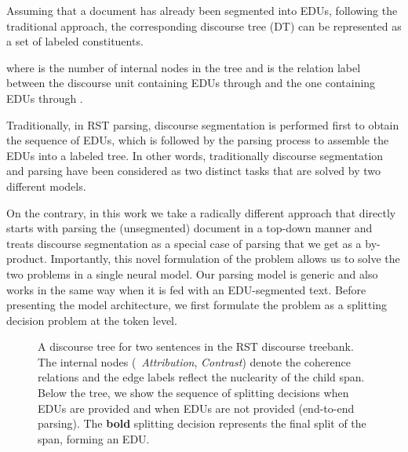 
Assuming that a document has already been segmented into EDUs, following the traditional approach, the corresponding discourse tree (DT) can be represented as a set of {labeled constituents}.

where  is the number of internal nodes in the tree and  is the relation label between the discourse unit containing EDUs  through  and the one containing EDUs  through . 

Traditionally, in RST parsing, {discourse segmentation} is performed first to obtain the sequence of EDUs, which is followed by the {parsing} process to assemble the EDUs into a labeled tree. In other words, traditionally discourse segmentation and parsing have been considered as two distinct tasks that are solved by two different models. 

On the contrary, in this work we take a radically different approach that directly starts with parsing the (unsegmented) document in a top-down manner and treats discourse segmentation as a special case of parsing that we get as a by-product. Importantly, this novel formulation of the problem allows us to solve the two problems in a single neural model. Our parsing model is generic and also works in the same way when it is fed with an EDU-segmented text. Before presenting the model architecture, we first formulate the problem as a splitting decision problem at the token level.  

\begin{figure*}[t!]
\caption{A discourse tree for two sentences in the RST discourse treebank. The internal nodes (\eg\ \emph{Attribution}, \emph{Contrast}) denote the coherence relations and the edge labels reflect the nuclearity of the child span. Below the tree, we show the sequence of splitting decisions  when EDUs are provided and  when EDUs are not provided (end-to-end parsing). The \textbf{bold} splitting decision represents the final split of the span, forming an EDU.
} 
\label{fig:Discourse2SplittingFormat}
\end{figure*}

